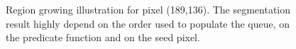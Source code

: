 \begin{figure}[htbp]
 \centering\caption{Region growing illustration for pixel (189,136). The segmentation result highly depend on the order used to populate the queue, on the predicate function and on the seed pixel.}
 \hfill
 
 \hfill{}%
 \label{fig:regiongrowing:python:result}%
\end{figure}
